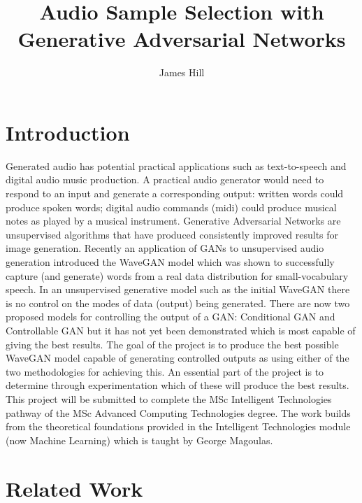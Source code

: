 \documentclass[a4paper, titlepage]{article}
\title{Audio Sample Selection with Generative Adversarial Networks}
\author{James Hill}
\date{}
\begin{document}
\maketitle

\section{Introduction}

Generated audio has potential practical applications such as text-to-speech and digital audio music production.
A practical audio generator would need to respond to an input and generate a corresponding output: written words could produce spoken words; digital audio commands (midi) could produce musical notes as played by a musical instrument.
\newline
\newline
Generative Adversarial Networks \cite{2014arXiv1406.2661G} are unsupervised algorithms that have produced consistently improved results for image generation.
Recently an application of GANs to unsupervised audio generation introduced the WaveGAN model \cite{2018arXiv180204208D} which was shown to successfully capture (and generate) words from a real data distribution for small-vocabulary speech.
\newline
\newline
In an unsupervised generative model such as the initial WaveGAN there is no control on the modes of data (output) being generated.
There are now two proposed models for controlling the output of a GAN: Conditional GAN and Controllable GAN but it has not yet been demonstrated which is most capable of giving the best results.
\newline
\newline
The goal of the project is to produce the best possible WaveGAN model capable of generating controlled outputs as using either of the two methodologies for achieving this.
An essential part of the project is to determine through experimentation which of these will produce the best results.
\newline
\newline
This project will be submitted to complete the MSc Intelligent Technologies pathway of the MSc Advanced Computing Technologies degree.
The work builds from the theoretical foundations provided in the Intelligent Technologies module (now Machine Learning) which is taught by George Magoulas.

\section{Related Work}
\end{document}
